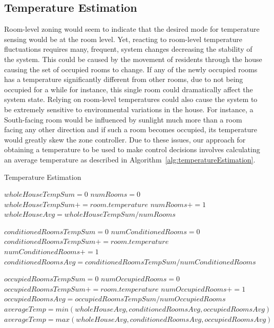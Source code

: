 \subsection{Temperature Estimation}
\label{sec:temperatureEstimation}
Room-level zoning would seem to indicate that the desired mode for temperature
sensing would be at the room level. Yet, reacting to room-level temperature
fluctuations requires many, frequent, system changes decreasing the stability of
the system. This could be caused by the movement of residents through the house
causing the set of occupied rooms to change. If any of the newly occupied rooms
has a temperature significantly different from other rooms, due to not being
occupied for a while for instance, this single room could dramatically affect
the system state. Relying on room-level temperatures could also cause the system
to be extremely sensitive to environmental variations in the house.  For
instance, a South-facing room would be influenced by sunlight much more than a
room facing any other direction and if such a room becomes occupied, its
temperature would greatly skew the zone controller. Due to these issues, our
approach for obtaining a temperature to be used to make control decisions
involves calculating an average temperature as described in
Algorithm~\ref{alg:temperatureEstimation}. 

\begin{algorithm}                      %
\caption{Temperature Estimation}          %
\label{alg:temperatureEstimation}%
\begin{algorithmic}                    %
\STATE $wholeHouseTempSum = 0$
\STATE $numRooms = 0$
\STATE $wholeHouseTempSum += room.temperature$
\STATE $numRooms += 1$
\ENDFOR
\STATE $wholeHouseAvg = wholeHouseTempSum / numRooms$

\STATE $conditionedRoomsTempSum = 0$
\STATE $numConditionedRooms = 0$
\STATE $conditionedRoomsTempSum += room.temperature$
\STATE $numConditionedRooms += 1$
\ENDIF
\ENDFOR
\STATE $conditionedRoomsAvg = conditionedRoomsTempSum / numConditionedRooms$

\STATE $occupiedRoomsTempSum = 0$
\STATE $numOccupiedRooms = 0$
\STATE $occupiedRoomsTempSum += room.temperature$
\STATE $numOccupiedRooms += 1$
\ENDIF
\ENDFOR
\STATE $occupiedRoomsAvg = occupiedRoomsTempSum / numOccupiedRooms$
\STATE $averageTemp = min(wholeHouseAvg, conditionedRoomsAvg,
occupiedRoomsAvg)$
\ELSE
\STATE $averageTemp = max(wholeHouseAvg, conditionedRoomsAvg,
occupiedRoomsAvg)$
\ENDIF
\end{algorithmic}
\end{algorithm}

